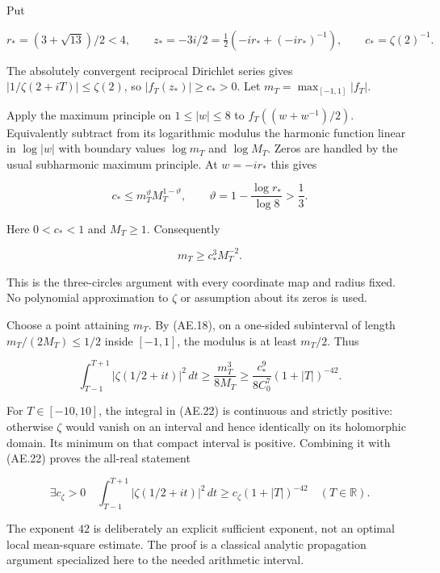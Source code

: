 Put

\[
 r_*=(3+\sqrt{13})/2<4,\qquad
 z_*=-3i/2=\tfrac12(-ir_*+(-ir_*)^{-1}),\qquad
 c_* =\zeta(2)^{-1}.                                                    \tag{AE.19}\label{AE.eq.19}
\]

The absolutely convergent reciprocal Dirichlet series gives
\(|1/\zeta(2+iT)|\le\zeta(2)\), so \(|f_T(z_*)|\ge c_*>0\). Let
\(m_T=\max_{[-1,1]}|f_T|\).

Apply the maximum principle on \(1\le|w|\le8\) to \(f_T((w+w^{-1})/2)\).
Equivalently subtract from its logarithmic modulus the harmonic function
linear in \(\log|w|\) with boundary values \(\log m_T\) and
\(\log M_T\). Zeros are handled by the usual subharmonic maximum
principle. At \(w=-ir_*\) this gives

\[
 c_*\le m_T^{\vartheta}M_T^{1-\vartheta},\qquad
 \vartheta=1-\frac{\log r_*}{\log8}>\frac13.
                                                                         \tag{AE.20}\label{AE.eq.20}
\]

Here \(0<c_*<1\) and \(M_T\ge1\). Consequently

\[
 m_T\ge c_*^3M_T^{-2}.                                                 \tag{AE.21}\label{AE.eq.21}
\]

This is the three-circles argument with every coordinate map and radius
fixed. No polynomial approximation to \(\zeta\) or assumption about its
zeros is used.

Choose a point attaining \(m_T\). By (AE.18), on a one-sided subinterval of
length \(m_T/(2M_T)\le1/2\) inside \([-1,1]\), the modulus is at least
\(m_T/2\). Thus

\[
 \int_{T-1}^{T+1}|\zeta(1/2+it)|^2\,dt
 \ge \frac{m_T^3}{8M_T}
 \ge \frac{c_*^9}{8C_0^7}(1+|T|)^{-42}.                                \tag{AE.22}\label{AE.eq.22}
\]

For \(T\in[-10,10]\), the integral in (AE.22) is continuous and strictly
positive: otherwise \(\zeta\) would vanish on an interval and hence
identically on its holomorphic domain. Its minimum on that compact
interval is positive. Combining it with (AE.22) proves the all-real
statement

\[
 \boxed{\exists c_\zeta>0\quad
 \int_{T-1}^{T+1}|\zeta(1/2+it)|^2\,dt
 \ge c_\zeta(1+|T|)^{-42}\quad(T\in\mathbb R).}                         \tag{AE.23}\label{AE.eq.23}
\]

The exponent \(42\) is deliberately an explicit sufficient exponent, not
an optimal local mean-square estimate. The proof is a classical analytic
propagation argument specialized here to the needed arithmetic interval.

